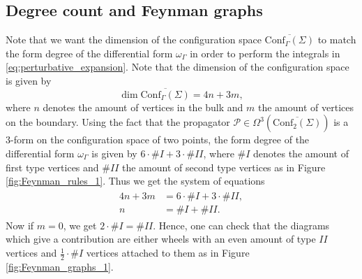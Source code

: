 \documentclass[11pt,colorinlistoftodos]{amsart}
\numberwithin{equation}{subsection}
\theoremstyle{plain}
\theoremstyle{definition}
\theoremstyle{remark}
\begin{document}
\subsection{Degree count and Feynman graphs}
\label{subsec:Degree_count_and_Feynman_graphs}
Note that we want the dimension of the configuration space $\overline{\mathrm{Conf}_\Gamma(\Sigma)}$ to match the form degree of the differential form $\omega_\Gamma$ in order to perform the integrals in \eqref{eq:perturbative_expansion}. Note that the dimension of the configuration space is given by 
\[
\dim \overline{\mathrm{Conf}_\Gamma(\Sigma)}=4n+3m,
\]
where $n$ denotes the amount of vertices in the bulk and $m$ the amount of vertices on the boundary. Using the fact that the propagator $\mathscr{P}\in \Omega^3(\overline{\mathrm{Conf}_2(\Sigma)})$ is a 3-form on the configuration space of two points, the form degree of the differential form $\omega_\Gamma$ is given by $6\cdot\#I+3\cdot\#II$, where $\#I$ denotes the amount of first type vertices and $\#II$ the amount of second type vertices as in Figure \ref{fig:Feynman_rules_1}. Thus we get the system of equations
\begin{align}
\begin{split}
\label{eq:degree_count_1}
    4n+3m&=6\cdot\#I+3\cdot\#II,\\
    n&=\#I+\#II.
\end{split}
\end{align}
Now if $m=0$, we get $2\cdot\#I=\#II$. Hence, one can check that the diagrams which give a contribution are either wheels with an even amount of type $II$ vertices and $\frac{1}{2}\cdot\#I$ vertices attached to them as in Figure \ref{fig:Feynman_graphs_1}.
\end{document}
